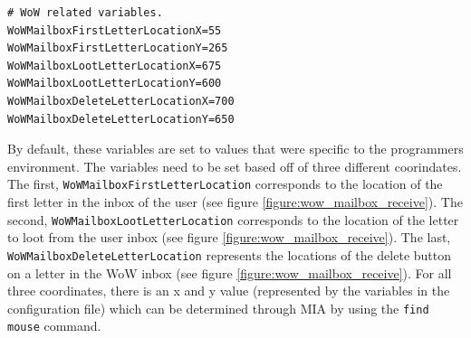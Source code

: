 \begin{lstlisting}[style=pythonstyle]
# WoW related variables.
WoWMailboxFirstLetterLocationX=55
WoWMailboxFirstLetterLocationY=265
WoWMailboxLootLetterLocationX=675
WoWMailboxLootLetterLocationY=600
WoWMailboxDeleteLetterLocationX=700
WoWMailboxDeleteLetterLocationY=650
\end{lstlisting}

By default, these variables are set to values that were specific to the programmers environment. The variables need to be set based off of three different coorindates. The first, \texttt{WoWMailboxFirstLetterLocation} corresponds to the location of the first letter in the inbox of the user (see figure \ref{figure:wow_mailbox_receive}). The second, \texttt{WoWMailboxLootLetterLocation} corresponds to the location of the letter to loot from the user inbox (see figure \ref{figure:wow_mailbox_receive}). The last, \texttt{WoWMailboxDeleteLetterLocation} represents the locations of the delete button on a letter in the WoW inbox (see figure \ref{figure:wow_mailbox_receive}).  For all three coordinates, there is an x and y value (represented by the variables in the configuration file) which can be determined through MIA by using the \texttt{find mouse} command.
